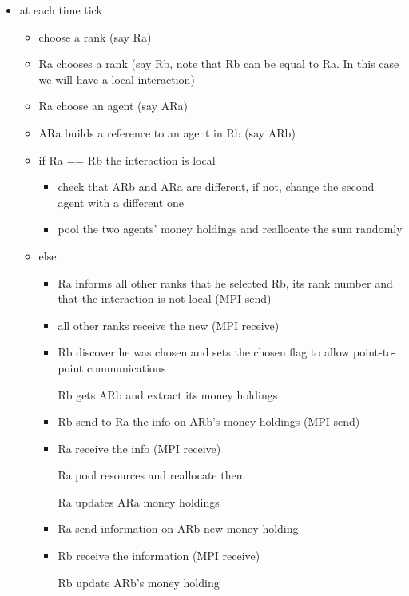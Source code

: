 \documentclass{article}
\providecommand{\tightlist}{%
  \setlength{\itemsep}{0pt}\setlength{\parskip}{0pt}}
\begin{document}
\begin{itemize}
\tightlist
\item
  at each time tick

  \begin{itemize}
  \tightlist
  \item
    choose a rank (say Ra)
  \item
	  Ra chooses a rank (say Rb, note that Rb can be equal to Ra. In this case we will have a local interaction)
  \item
    Ra choose an agent (say ARa)
   \item
	   ARa builds a reference to an agent in Rb (say ARb)
  \item
    if Ra == Rb the interaction is local
    \begin{itemize}
		    \tightlist
    \item
	    check that ARb and ARa are different, if not, change the second agent with a different one
    \item
      pool the two agents' money holdings and reallocate the sum randomly
    \end{itemize}
  \item
    else

    \begin{itemize}
    \tightlist
    \item
	    Ra informs all other ranks that he selected Rb, its rank number and that the interaction is not local (MPI send)
    \item
	    all other ranks receive the new (MPI receive)
    \item
	    Rb discover he was chosen and sets the chosen flag to allow point-to-point communications
	    
	    Rb gets ARb and extract its money holdings
    \item
	    Rb send to Ra the info on ARb's money holdings (MPI send)
    \item
	    Ra receive the info (MPI receive)

	    Ra pool resources and reallocate them

	    Ra updates ARa money holdings
    \item
	    Ra send information on ARb new money holding
    \item
	    Rb receive the information (MPI receive)

	    Rb update ARb's money holding
    \end{itemize}
  \end{itemize}
\end{itemize}
\end{document}

